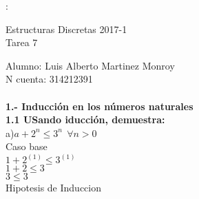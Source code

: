 \documentclass[paper=letter, fontsize=12pt]{scrartcl}
\begin{document}
\parindent=0mm:
	\begin{center}
  Estructuras Discretas 2017-1\\
  Tarea 7\\
\end{center}

Alumno: Luis Alberto Martinez Monroy\\
N cuenta: 314212391\\ \\
{\large\bf 1.- Inducción en los números naturales}\\
{\bf 1.1 USando iducción, demuestra:}\\
a)$a+2^n \leq 3^n \medspace \medspace \forall n> 0$\\
Caso base\\
$1+2^(1)\leq 3^(1)$\\
$1+ 2 \leq 3$\\
$3 \leq 3$\\

Hipotesis de Induccion\\

 
\end{document}
